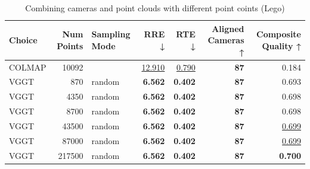 \begin{table}[H]
\caption{Combining cameras and point clouds with different point coints (Lego)}
\label{tab:07_combined_num_points_lego}
\begin{tabular}{lrlrrrr}
\toprule
Choice & Num Points & Sampling Mode & RRE ↓ & RTE ↓ & Aligned Cameras ↑ & Composite Quality ↑ \\
\midrule
COLMAP & 10092 &  & \underline{12.910} & \underline{0.790} & \textbf{87} & 0.184 \\
VGGT & 870 & random & \textbf{6.562} & \textbf{0.402} & \textbf{87} & 0.693 \\
VGGT & 4350 & random & \textbf{6.562} & \textbf{0.402} & \textbf{87} & 0.698 \\
VGGT & 8700 & random & \textbf{6.562} & \textbf{0.402} & \textbf{87} & 0.698 \\
VGGT & 43500 & random & \textbf{6.562} & \textbf{0.402} & \textbf{87} & \underline{0.699} \\
VGGT & 87000 & random & \textbf{6.562} & \textbf{0.402} & \textbf{87} & \underline{0.699} \\
VGGT & 217500 & random & \textbf{6.562} & \textbf{0.402} & \textbf{87} & \textbf{0.700} \\
\bottomrule
\end{tabular}
\end{table}
